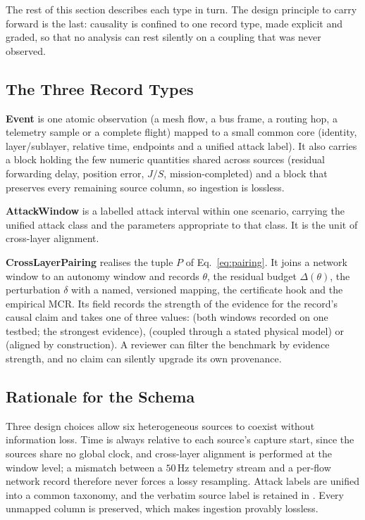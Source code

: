 The rest of this section describes each type in turn. The design
principle to carry forward is the last: causality is confined to one record
type, made explicit and graded, so that no analysis can rest silently on a
coupling that was never observed.

\subsection{The Three Record Types}
\textbf{Event} is one atomic observation (a mesh flow, a bus frame, a routing
hop, a telemetry sample or a complete flight) mapped to a small common core
(identity, layer/sublayer, relative time, endpoints and a unified attack label).
It also carries a  block holding the few numeric quantities shared
across sources (residual forwarding delay, position error, $J/S$,
mission-completed) and a  block that preserves every remaining
source column, so ingestion is lossless.

\textbf{AttackWindow} is a labelled attack interval within one scenario,
carrying the unified attack class and the  parameters
appropriate to that class. It is the unit of cross-layer alignment.

\textbf{CrossLayerPairing} realises the tuple $P$ of Eq.~\eqref{eq:pairing}. It
joins a network window to an autonomy window and records $\theta$, the residual
budget $\Delta(\theta)$, the perturbation $\delta$ with a named,
versioned mapping, the certificate hook and the empirical MCR. Its
 field records the strength of the evidence for the
record's causal claim and takes one of three values:
 (both windows recorded on one testbed; the
strongest evidence),  (coupled through a stated physical
model) or  (aligned by construction). A reviewer can
filter the benchmark by evidence strength, and no claim can silently
upgrade its own provenance.

\subsection{Rationale for the Schema}
Three design choices allow six heterogeneous sources to coexist without information
loss. Time is always relative to each source's capture start,
since the sources share no global clock, and cross-layer alignment is performed
at the window level; a mismatch between a $50$\,Hz telemetry stream and a
per-flow network record therefore never forces a lossy resampling. Attack
labels are unified into a common taxonomy, and the verbatim source label
is retained in . Every unmapped column is preserved,
which makes ingestion provably lossless.


